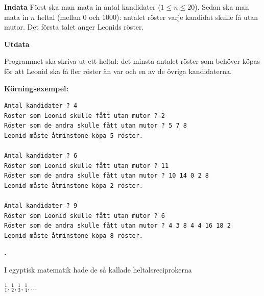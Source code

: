 \documentclass[a4paper,12pt]{article}
\newcounter{iii}\setcounter{iii}{0}
\def\i{\bigskip\noindent\refstepcounter{iii}\textbf{\arabic{iii}.} }
\begin{document}
\textbf{Indata}
Först ska man mata in antal kandidater ($1 \le n \le 20$). Sedan ska man mata in $n$ heltal (mellan 0 och 1000): antalet röster varje kandidat skulle få utan mutor. Det första talet anger Leonids röster.

\textbf{Utdata}

Programmet ska skriva ut ett heltal: det minsta antalet röster som behöver köpas för att Leonid ska få fler röster än var och en av de övriga kandidaterna.

\pagebreak
\textbf{Körningsexempel:}
\begin{lstlisting}
Antal kandidater ? 4
Röster som Leonid skulle fått utan mutor ? 2 
Röster som de andra skulle fått utan mutor ? 5 7 8
Leonid måste åtminstone köpa 5 röster.

Antal kandidater ? 6
Röster som Leonid skulle fått utan mutor ? 11
Röster som de andra skulle fått utan mutor ? 10 14 0 2 8
Leonid måste åtminstone köpa 2 röster.

Antal kandidater ? 9
Röster som Leonid skulle fått utan mutor ? 6
Röster som de andra skulle fått utan mutor ? 4 3 8 4 4 16 18 2
Leonid måste åtminstone köpa 8 röster.
\end{lstlisting}

\i



I egyptisk matematik hade de så kallade heltalsreciprokerna

${\displaystyle {\frac {1}{1}},{\frac {1}{2}},{\frac {1}{3}},{\frac {1}{4}},...}$
\end{document}
